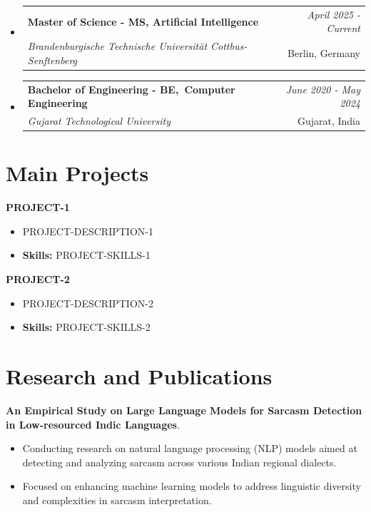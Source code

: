 \documentclass[a4paper,11pt]{article}
\makeatletter
\newcommand{\resumeSubheading}[4]{
\vspace{0.5mm}\item
    \begin{tabular*}{0.98\textwidth}[t]{l@{\extracolsep{\fill}}r}
        \textbf{#1} & \textit{\footnotesize{#4}} \\
        \textit{\footnotesize{#3}} &  \footnotesize{#2}\\
    \end{tabular*}
    \vspace{-2.4mm}
}
\makeatother
\begin{document}
\begin{itemize}
\resumeSubheading
{Master of Science - MS, Artificial Intelligence }{Berlin, Germany}
{Brandenburgische Technische Universität Cottbus-Senftenberg  }{April 2025 - Current}

\vspace{1.0mm} %
\resumeSubheading
{Bachelor of Engineering - BE, Computer Engineering  }{Gujarat, India}
{Gujarat Technological University }{June 2020 - May 2024}

\end{itemize}
\section{\textbf{Main Projects}}

\vspace{1mm}
  \textbf{PROJECT-1  } 
\vspace{-1.5mm} %
\begin{itemize}
  \item PROJECT-DESCRIPTION-1
\vspace{-3mm}
  \item \textbf{Skills:} PROJECT-SKILLS-1
\end{itemize}


\vspace{1mm}
   \textbf{PROJECT-2 } 
\vspace{-1.5mm} %
\begin{itemize}
  \item PROJECT-DESCRIPTION-2
\vspace{-3mm}
  \item \textbf{Skills:} PROJECT-SKILLS-2
\end{itemize}



\section{\textbf{Research and Publications} \hfill }
\vspace{1mm}
  \textbf{An Empirical Study on Large Language Models for Sarcasm Detection in Low-resourced Indic Languages}. 
\vspace{-1mm} %
\begin{itemize}
  \item Conducting research on natural language processing (NLP) models aimed at detecting and analyzing sarcasm across various Indian regional dialects. 
\vspace{-3mm}
  \item Focused on enhancing machine learning models to address linguistic diversity and complexities in sarcasm interpretation.
\end{itemize}
\end{document}

